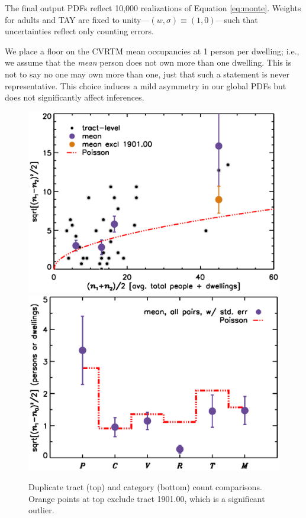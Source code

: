 \documentclass[11pt,twocolumn]{article}
\begin{document}
The final output PDFs reflect 10,000 realizations of Equation \ref{eq:monte}. Weights for 
adults and TAY are fixed to unity---$(w,\sigma)\equiv(1,0)$---such that uncertainties reflect only 
counting errors. 


We place a floor on the CVRTM mean occupancies at 1 person per dwelling; i.e., we assume that the 
{\it mean} person does not own more than one dwelling. This is not to say no one may own more than 
one, just that such a statement is never representative. This choice induces a mild asymmetry in our 
global PDFs but does not significantly affect inferences.

\begin{figure}[t]
\centering
	\includegraphics[width=\linewidth, trim = 1cm 0cm 0cm 0cm]{intDupeChar}\\
	\includegraphics[width=\linewidth, trim = 1cm 0.5cm 0cm 0cm]{catDupeChar}
\caption{Duplicate tract (top) and category (bottom) count comparisons. Orange 
		points at top exclude tract 1901.00, which is a significant outlier.}
\label{fig:dupeChar}
\end{figure}
\end{document}
